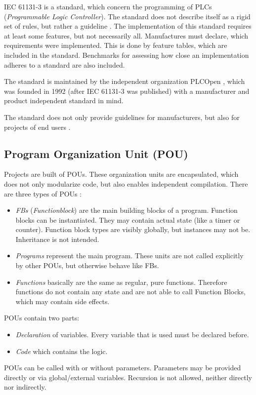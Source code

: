IEC 61131-3 is a standard, which concern the programming of PLCs (\emph{Programmable Logic Controller}). The standard does not describe itself as a rigid set of rules, but rather a guideline \cite{johnIEC611313Programming2010}. The implementation of this standard requires at least some features, but not necessarily all. Manufactures must declare, which requirements were implemented. This is done by feature tables, which are included in the standard. Benchmarks for assessing how close an implementation adheres to a standard are also included.


The standard is maintained by the independent organization PLCOpen \cite{eldijkWhatPLCopen2018}, which was founded in 1992 (after IEC 61131-3 was published) with a manufacturer and product independent standard in mind.


The standard does not only provide guidelines for manufacturers, but also for projects of end users \cite{johnIEC611313Programming2010}.
\subsection{Program Organization Unit (POU)}
\label{sub:pou}
Projects are built of POUs. These organization units are encapsulated, which does not only modularize code, but also enables independent compilation.
There are three types of POUs \cite{johnIEC611313Programming2010}:
\begin{itemize}
	\item \emph{FBs} (\emph{Functionblock}) are the main building blocks of a program. Function blocks can be instantiated. They may contain actual state (like a timer or counter). Function block types are visibly globally, but instances may not be. Inheritance is not intended.
	\item \emph{Programs} represent the main program. These units are not called explicitly by other POUs, but otherwise behave like FBs.
	\item \emph{Functions} basically are the same as regular, pure functions. Therefore functions do not contain any state and are not able to call Function Blocks, which may contain side effects. 
\end{itemize}
POUs contain two parts:
\begin{itemize}
	\item \emph{Declaration} of variables. Every variable that is used must be declared before.
	\item \emph{Code} which contains the logic. 
\end{itemize}
POUs can be called with or without parameters. Parameters may be provided directly or via global/external variables.
Recursion is not allowed, neither directly nor indirectly. 


